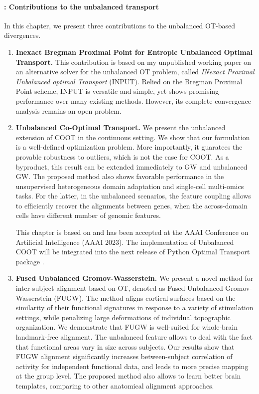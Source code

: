 \paragraph{: Contributions to the unbalanced transport}

In this chapter, we present three contributions to the unbalanced OT-based divergences.
\begin{enumerate}
    \item \textbf{Inexact Bregman Proximal Point for Entropic Unbalanced Optimal Transport.}
    This contribution is based on my unpublished working paper on an alternative solver
    for the unbalanced OT problem,
    called \textit{INexact Proximal Unbalanced optimal Transport} (INPUT).
    Relied on the Bregman Proximal Point scheme,
    INPUT is versatile and simple, yet shows promising performance over many existing methods.
    However, its complete convergence analysis remains an open problem.

    \item \textbf{Unbalanced Co-Optimal Transport.}
    We present the unbalanced extension of COOT in the
    continuous setting. We show that our formulation is a well-defined optimization problem.
    More importantly, it guaratees the provable robustness to outliers,
    which is not the case for COOT. As a byproduct, this result can be
    extended immediately to GW and unbalanced GW.
    The proposed method also shows favorable performance in
    the unsupervised heterogeneous domain adaptation and single-cell multi-omics tasks.
    For the latter, in the unbalanced scenarios, the feature coupling allows to efficiently recover
    the alignments between genes, when the across-domain cells have
    different number of genomic features.

    This chapter is based on \citep{Tran23} and has been accepted at the
    AAAI Conference on Artificial Intelligence (AAAI 2023). The implementation of
    Unbalanced COOT will be
    integrated into the next release of Python Optimal Transport package \citep{Flamary21}.

    \item \textbf{Fused Unbalanced Gromov-Wasserstein.}
    We present a novel method for inter-subject alignment based on OT,
    denoted as Fused Unbalanced Gromov-Wasserstein (FUGW). The method aligns cortical surfaces based
    on the similarity of their functional signatures in response to a variety of stimulation settings,
    while penalizing large deformations of individual topographic organization. We demonstrate that
    FUGW is well-suited for whole-brain landmark-free alignment. The unbalanced feature allows
    to deal with the fact that functional areas vary in size across subjects. Our results show that
    FUGW alignment significantly increases between-subject correlation of activity for independent
    functional data, and leads to more precise mapping at the group level.
    The proposed method also allows to learn better brain templates, comparing to other anatomical
    alignment approaches.


\end{enumerate}

